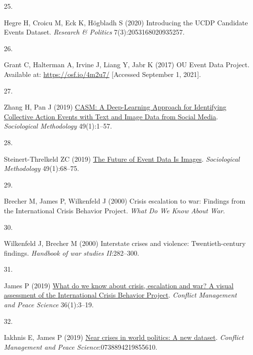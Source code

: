 \documentclass[9pt,twocolumn,twoside,lineno]{pnas-new}
\newlength{\cslhangindent}
\newlength{\csllabelwidth}
\newlength{\cslentryspacingunit} %
\newenvironment{CSLReferences}[2] %
 {%
  \setlength{\parindent}{0pt}
  \ifodd #1
  \let\oldpar\par
  \def\par{\hangindent=\cslhangindent\oldpar}
  \fi
  \setlength{\parskip}{#2\cslentryspacingunit}
 }%
 {}
\newcommand{\CSLLeftMargin}[1]{\parbox[t]{\csllabelwidth}{#1}}
\newcommand{\CSLRightInline}[1]{\parbox[t]{\linewidth - \csllabelwidth}{#1}\break}
\begin{document}
\begin{CSLReferences}{0}{0}
\leavevmode{}%
\CSLLeftMargin{25. }%
\CSLRightInline{Hegre H, Croicu M, Eck K, Högbladh S (2020) Introducing
the {UCDP Candidate Events Dataset}. \emph{Research \& Politics}
7(3):2053168020935257.}

\leavevmode{}%
\CSLLeftMargin{26. }%
\CSLRightInline{Grant C, Halterman A, Irvine J, Liang Y, Jabr K (2017)
{OU Event Data Project}. Available at: \url{https://osf.io/4m2u7/}
{[}Accessed September 1, 2021{]}.}

\leavevmode{}%
\CSLLeftMargin{27. }%
\CSLRightInline{Zhang H, Pan J (2019)
\href{https://doi.org/10.1177/0081175019860244}{{CASM}: {A Deep-Learning
Approach} for {Identifying Collective Action Events} with {Text} and
{Image Data} from {Social Media}}. \emph{Sociological Methodology}
49(1):1--57.}

\leavevmode{}%
\CSLLeftMargin{28. }%
\CSLRightInline{Steinert-Threlkeld ZC (2019)
\href{https://doi.org/10.1177/0081175019860238}{The {Future} of {Event
Data Is Images}}. \emph{Sociological Methodology} 49(1):68--75.}

\leavevmode{}%
\CSLLeftMargin{29. }%
\CSLRightInline{Brecher M, James P, Wilkenfeld J (2000) Crisis
escalation to war: {Findings} from the {International Crisis Behavior
Project}. \emph{What Do We Know About War}.}

\leavevmode{}%
\CSLLeftMargin{30. }%
\CSLRightInline{Wilkenfeld J, Brecher M (2000) Interstate crises and
violence: Twentieth-century findings. \emph{Handbook of war studies
II}:282--300.}

\leavevmode{}%
\CSLLeftMargin{31. }%
\CSLRightInline{James P (2019)
\href{https://doi.org/10.1177/0738894218793135}{What do we know about
crisis, escalation and war? {A} visual assessment of the {International
Crisis Behavior Project}}. \emph{Conflict Management and Peace Science}
36(1):3--19.}

\leavevmode{}%
\CSLLeftMargin{32. }%
\CSLRightInline{Iakhnis E, James P (2019)
\href{https://doi.org/10.1177/0738894219855610}{Near crises in world
politics: {A} new dataset}. \emph{Conflict Management and Peace
Science}:0738894219855610.}


\end{CSLReferences}
\end{document}

